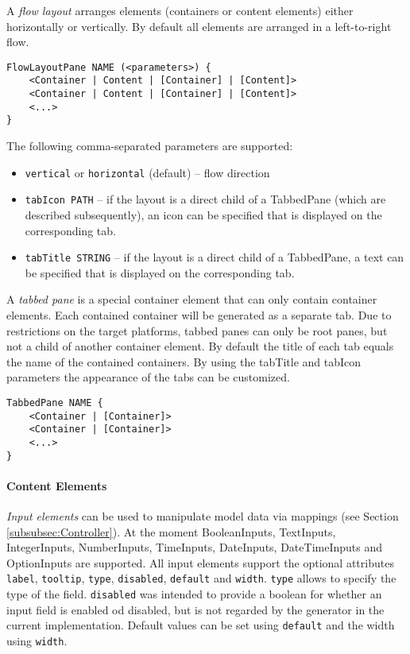 A \textit{flow layout} arranges elements (containers or content elements) either horizontally or vertically. By default all elements are arranged in a left-to-right flow.
\begin{lstlisting}
FlowLayoutPane NAME (<parameters>) {
	<Container | Content | [Container] | [Content]>
	<Container | Content | [Container] | [Content]>
	<...>
}
\end{lstlisting}
The following comma-separated parameters are supported:
\begin{itemize}
\item \lstinline!vertical! or \lstinline!horizontal! (default) -- flow direction
\item \lstinline!tabIcon PATH! -- if the layout is a direct child of a TabbedPane (which are described subsequently), an icon can be specified that is displayed on the corresponding tab.
\item \lstinline!tabTitle STRING! -- if the layout is a direct child of a TabbedPane, a text can be specified that is displayed on the corresponding tab.
\end{itemize}

A \textit{tabbed pane} is a special container element that can only contain container elements. Each contained container will be generated as a separate tab. Due to restrictions on the target platforms, tabbed panes can only be root panes, but not a child of another container element. By default the title of each tab equals the name of the contained containers. By using the tabTitle and tabIcon parameters the appearance of the tabs can be customized.
\begin{lstlisting}
TabbedPane NAME {
	<Container | [Container]>
	<Container | [Container]>
	<...>
}
\end{lstlisting}

\paragraph{Content Elements}
\textit{Input elements} can be used to manipulate model data via mappings (see Section \ref{subsubsec:Controller}). At the moment BooleanInputs, TextInputs, IntegerInputs, NumberInputs, TimeInputs, DateInputs, DateTimeInputs and OptionInputs are supported. All input elements support the optional attributes \lstinline!label!, \lstinline!tooltip!, \lstinline!type!, \lstinline!disabled!, \lstinline!default! and \lstinline!width!. \lstinline!type! allows to specify the type of the field. \lstinline!disabled! was intended to provide a boolean for whether an input field is enabled od disabled, but is not regarded by the generator in the current implementation. Default values can be set using \lstinline!default! and the width using \lstinline!width!.

